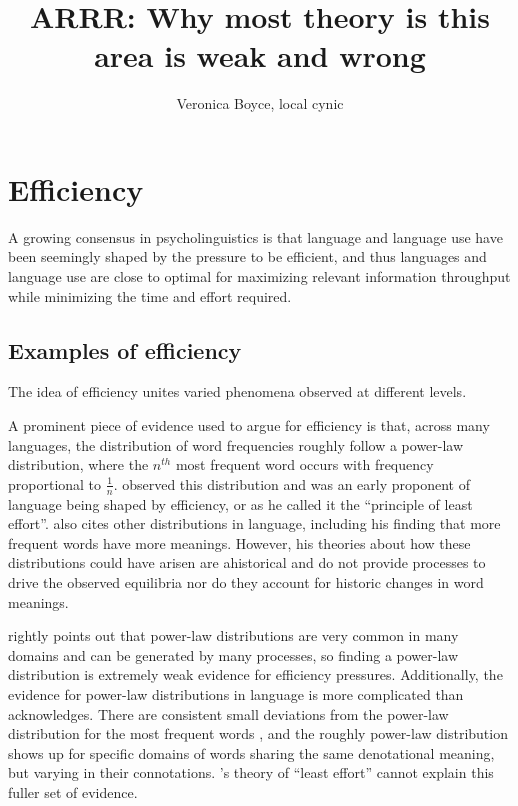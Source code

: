 \documentclass[]{article}
\title{ARRR: Why most theory is this area is weak and wrong}
\author{Veronica Boyce, local cynic}
\begin{document}
\maketitle


	


	

	

	

	



\section{Efficiency}

A growing consensus in psycholinguistics is that language and language use have been seemingly shaped by the pressure to be efficient, and thus languages and language use are close to optimal for maximizing relevant information throughput while minimizing the time and effort required. 


\subsection{Examples of efficiency}
The idea of efficiency unites varied phenomena observed at different levels. 

A prominent piece of evidence used to argue for efficiency is that, across many languages, the distribution of word frequencies roughly follow a power-law distribution, where the $n^{th}$ most frequent word occurs with frequency proportional to $\frac{1}{n}$. \cite{zipf1949} observed this distribution and was an early proponent of language being shaped by efficiency, or as he called it the ``principle of least effort''. \cite{zipf1949} also cites other distributions in language, including his finding that more frequent words have more meanings. However, his theories about how these distributions could have arisen are ahistorical and do not provide processes to drive the observed equilibria nor do they account for historic changes in word meanings. 

\cite{piantadosi2014} rightly points out that power-law distributions are very common in many domains and can be generated by many processes, so finding a power-law distribution is extremely weak evidence for efficiency pressures. Additionally, the evidence for power-law distributions in language is more complicated than \cite{zipf1949} acknowledges. There are consistent small deviations from the power-law distribution for the most frequent words \cite{piantadosi2014}, and the roughly power-law distribution shows up for specific domains of words sharing the same denotational meaning, but varying in their connotations. \cite{zipf1949}'s theory of ``least effort'' cannot explain this fuller set of evidence. %
\end{document}
